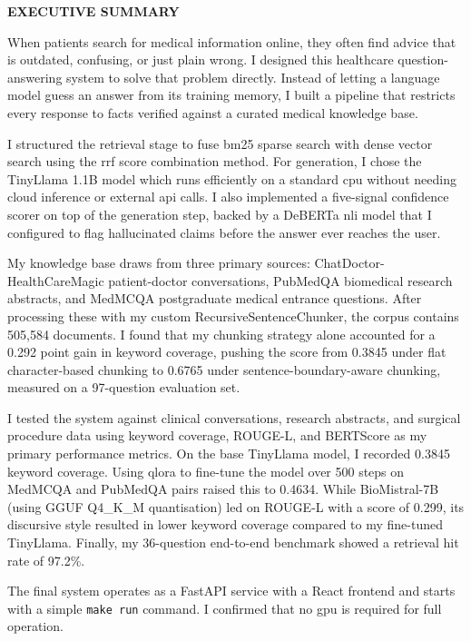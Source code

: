\begin{center}
	\Large{\textbf{EXECUTIVE SUMMARY}}
\end{center}
\vspace{1em}
\normalsize

When patients search for medical information online, they often find advice that is outdated, confusing, or just plain wrong. I designed this healthcare question-answering system to solve that problem directly. Instead of letting a language model guess an answer from its training memory, I built a pipeline that restricts every response to facts verified against a curated medical knowledge base.

I structured the retrieval stage to fuse \ac{bm25} sparse search with dense vector search using the \ac{rrf} score combination method. For generation, I chose the TinyLlama 1.1B model which runs efficiently on a standard \ac{cpu} without needing cloud inference or external \ac{api} calls. I also implemented a five-signal confidence scorer on top of the generation step, backed by a DeBERTa \ac{nli} model that I configured to flag hallucinated claims before the answer ever reaches the user.

My knowledge base draws from three primary sources: ChatDoctor-HealthCareMagic patient-doctor conversations, PubMedQA biomedical research abstracts, and MedMCQA postgraduate medical entrance questions. After processing these with my custom RecursiveSentenceChunker, the corpus contains 505,584 documents. I found that my chunking strategy alone accounted for a 0.292 point gain in keyword coverage, pushing the score from 0.3845 under flat character-based chunking to 0.6765 under sentence-boundary-aware chunking, measured on a 97-question evaluation set.

I tested the system against clinical conversations, research abstracts, and surgical procedure data using keyword coverage, ROUGE-L, and BERTScore as my primary performance metrics. On the base TinyLlama model, I recorded 0.3845 keyword coverage. Using \ac{qlora} to fine-tune the model over 500 steps on MedMCQA and PubMedQA pairs raised this to 0.4634. While BioMistral-7B (using GGUF Q4\_K\_M\allowbreak{} quantisation) led on ROUGE-L with a score of 0.299, its discursive style resulted in lower keyword coverage compared to my fine-tuned TinyLlama. Finally, my 36-question end-to-end benchmark showed a retrieval hit rate of 97.2\%.

The final system operates as a FastAPI service with a React frontend and starts with a simple \texttt{make\allowbreak{} run} command. I confirmed that no \ac{gpu} is required for full operation.
